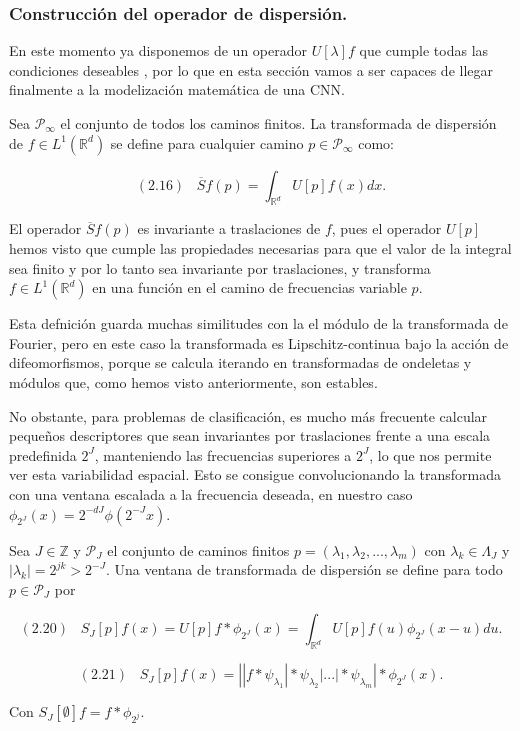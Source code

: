 \subsubsection{Construcción del operador de dispersión.}

\noindent En este momento ya disponemos de un operador $U[\lambda] f$ que cumple todas las condiciones deseables , por lo que en esta sección vamos a ser capaces de llegar finalmente a la modelización matemática de una CNN.

\begin{definicion} \label{def:S_barra}
Sea $\mathcal{P}_\infty$ el conjunto de todos los caminos finitos. La transformada de dispersión de $f \in L^1(\mathbb{R}^d)$ se define para cualquier camino $p \in \mathcal{P}_\infty$ como:

$$(2.16) \; \; \; \overline{S}f(p)=\int_{\mathbb{R}^d}U[p]f(x)dx .$$
\end{definicion}

\medskip

\noindent El operador $\overline{S}f(p)$ es invariante a traslaciones de $f$, pues el operador $U[p]$ hemos visto que cumple las propiedades necesarias para que el valor de la integral sea finito y por lo tanto sea invariante por traslaciones, y transforma $f \in L^1(\mathbb{R}^d)$ en una función en el camino de frecuencias variable $p$.

\medskip

\noindent Esta defnición guarda muchas similitudes con la el módulo de la transformada de Fourier, pero en este caso la transformada es Lipschitz-continua bajo la acción de difeomorfismos, porque se calcula iterando en transformadas de ondeletas y módulos que, como hemos visto anteriormente, son estables. 

\medskip

\noindent No obstante, para problemas de clasificación, es mucho más frecuente calcular pequeños descriptores que sean invariantes por traslaciones frente a una escala predefinida $2^J$, manteniendo las frecuencias superiores a $2^J$, lo que nos permite ver esta variabilidad espacial. Esto se consigue convolucionando la transformada con una ventana escalada a la frecuencia deseada, en nuestro caso $\phi_{2^J}(x)=2^{-dJ}\phi(2^{-J}x)$. 

\begin{definicion}
Sea $J \in \mathbb{Z}$ y $\mathcal{P}_J$ el conjunto de caminos finitos $p=(\lambda_1,\lambda_2,...,\lambda_m)$ con $\lambda_k \in \Lambda_J$ y $|\lambda_k|=2^{jk}>2^{-J}$. Una ventana de transformada de dispersión se define para todo $p \in \mathcal{P}_J$ por

$$(2.20) \;\;\; S_J[p]f(x)=U[p]f \ast \phi_{2^J}(x)=\int_{\mathbb{R}^d}U[p]f(u)\phi_{2^J}(x-u)du.$$

$$(2.21) \;\;\; S_J[p]f(x)=\left| |f \ast \psi_{\lambda_1} | \ast \psi_{\lambda_2} | ... | \ast \psi_{\lambda_m} \right| \ast \phi_{2^J}(x).$$

Con $S_J[\emptyset] f= f \ast \phi_{2^j}$.
\end{definicion}


